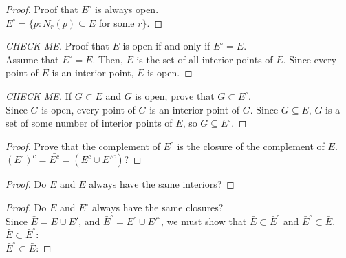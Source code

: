 \documentclass[10pt]{article}
\theoremstyle{definition}
\theoremstyle{plain}
\begin{document}
\begin{proof}
Proof that $E^\circ$ is always open. \\

$E^\circ = \{p: N_r(p) \subseteq E$ for some $r\}$.
\end{proof}

\begin{proof}[CHECK ME]
Proof that $E$ is open if and only if $E^\circ = E$. \\

Assume that $E^\circ =E$. Then, $E$ is the set of all interior points of $E$. Since every point of $E$ is an interior point, $E$ is open.
\end{proof}

\begin{proof}[CHECK ME]
If $G \subset E$ and $G$ is open, prove that $G\subset E^\circ$. \\

Since $G$ is open, every point of $G$ is an interior point of $G$. Since $G\subseteq E$, $G$ is a set of some number of interior points of $E$, so $G\subseteq E^\circ$.
\end{proof}

\begin{proof}
Prove that the complement of $E^\circ$ is the closure of the complement of $E$. \\

$(E^\circ)^c = \bar{E^c} = (E^c \cup E'^c)$?
\end{proof}

\begin{proof}
Do $E$ and $\bar{E}$ always have the same interiors?
\end{proof}

\begin{proof}
Do $E$ and $E^\circ$ always have the same closures? \\

Since $\bar{E} = E\cup E'$, and $\bar{E}^\circ = E^\circ \cup E'^\circ$, we must show that $\bar{E} \subset \bar{E}^\circ$ and $\bar{E}^\circ \subset \bar{E}$. \\

$\bar{E} \subset \bar{E}^\circ$: \\

$\bar{E}^\circ \subset \bar{E}$:
\end{proof}
\end{document}
